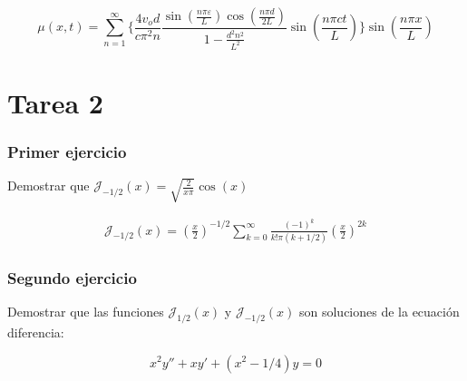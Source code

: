 \documentclass[11pt]{report}
\theoremstyle{plain}
\theoremstyle{definition}
\begin{document}
\begin{equation*}
	\mu(x,t)=\sum^\infty_{n=1}\lbrace \frac{4v_od}{c\pi^2n}\frac{\sin(\frac{n\pi\varepsilon}{L})\cos(\frac{n\pi d}{2L})}{1-\frac{d^2n^2}{L^2}} \sin(\frac{n\pi ct}{L})\rbrace\sin(\frac{n\pi x}{L})
\end{equation*}

\part{Tarea 2}
\section{Primer ejercicio}
Demostrar que $\mathcal{J}_{-1/2}(x) = \sqrt{\frac{2}{x\pi}}\cos(x)$

\begin{align*}
	\mathcal{J}_{-1/2}(x) = \left(\frac{x}{2}\right)^{-1/2} \sum^\infty_{k=0} \frac{(-1)^k}{k!\pi(k+1/2)} \left(\frac{x}{2}\right)^{2k}
\end{align*}

\section{Segundo ejercicio}
Demostrar que las funciones $\mathcal{J}_{1/2}(x)$ y $\mathcal{J}_{-1/2}(x)$ son soluciones de la ecuación diferencia:

\begin{equation*}
	x^2y'' + xy' + (x^2 - 1/4)y=0
\end{equation*}
\end{document}
